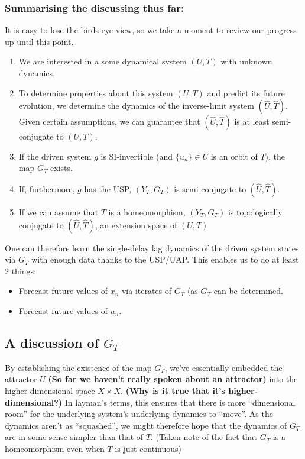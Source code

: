 \documentclass[12 pt]{article}
\begin{document}
\subsubsection*{Summarising the discussing thus far:}

It is easy to lose the birds-eye view, so we take a moment to review our progress up until this point.

\vspace{-8mm}
\begin{enumerate}
\item We are interested in a some dynamical system $(U,T)$ with unknown dynamics.
\item To determine properties about this system $(U,T)$ and predict its future evolution, we determine the dynamics of the inverse-limit system $(\widehat{U}, \widehat{T})$. Given certain assumptions, we can guarantee that $(\widehat{U}, \widehat{T})$ is at least semi-conjugate to $(U,T)$.
\item If the driven system $g$ is SI-invertible (and $\{u_n\}\in{U}$  is an orbit of $T$), the map $G_T$ exists. 
\item If, furthermore, $g$ has the USP, $(Y_T, G_T)$ is semi-conjugate to $(\widehat{U}, \widehat{T})$.
\item If we can assume that $T$ is a homeomorphism, $(Y_T, G_T)$ is topologically conjugate to $(\widehat{U}, \widehat{T})$, an extension space of $(U,T)$
\end{enumerate} 

One can therefore learn the single-delay lag dynamics of the driven system states via $G_T$ with enough data thanks to the USP/UAP. This enables us to do at least 2 things: 
\vspace{-8mm}
\begin{itemize}
\item Forecast future values of $x_n$ via iterates of $G_T$ (as $G_T$ can be determined.
\item Forecast future values of $u_n$. 
\end{itemize} 

\subsection{A discussion of $G_T$ }

By establishing the existence of the map $G_T$, we’ve essentially embedded the attractor $U$ \textbf{(So far we haven't really spoken about an attractor)} into the higher dimensional space $X\times{X}$. \textbf{(Why is it true that it's higher-dimensional?)}
In layman’s terms, this ensures that there is more “dimensional room” for the underlying system’s underlying dynamics to “move”. As the dynamics aren’t as “squashed”, we might therefore hope that the dynamics of $G_T$ are in some sense simpler than that of $T$. (Taken note of the fact that $G_T$ is a homeomorphism even when $T$ is just continuous)
 
\end{document}
